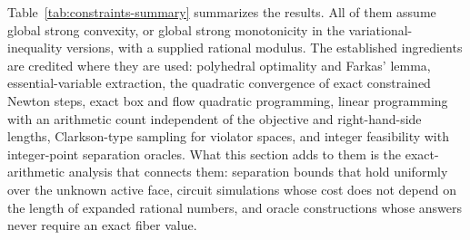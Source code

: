 Table~\ref{tab:constraints-summary} summarizes the results. All of them assume
global strong convexity, or global strong monotonicity in the
variational-inequality versions, with a supplied rational modulus. The
established ingredients are credited where they are used: polyhedral
optimality and Farkas' lemma, essential-variable extraction, the quadratic
convergence of exact constrained Newton steps, exact box and flow quadratic
programming, linear programming with an arithmetic count independent of the
objective and right-hand-side lengths, Clarkson-type sampling
for violator spaces, and integer feasibility with integer-point separation
oracles. What this section adds to them is the exact-arithmetic analysis
that connects them: separation bounds that hold uniformly over the unknown
active face, circuit simulations whose cost does not depend on the length of
expanded rational numbers, and oracle constructions whose answers never
require an exact fiber value.

